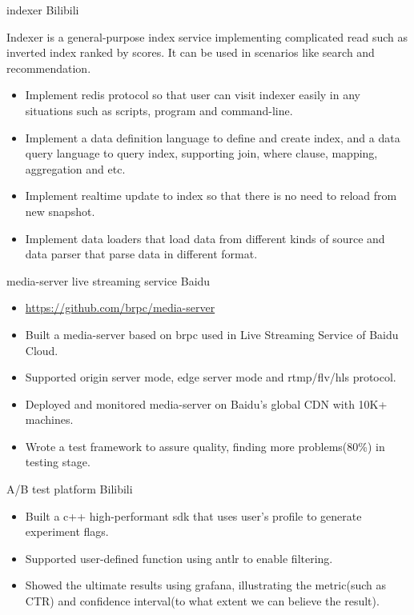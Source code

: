 \documentclass[11pt,a4paper]{moderncv}
\begin{document}
{indexer}
{Bilibili}
{}
{}
{
Indexer is a general-purpose index service implementing complicated read such as inverted index ranked by scores. It can be used in scenarios like search and recommendation.
\begin{itemize}
    \item Implement redis protocol so that user can visit indexer easily in any situations such as scripts, program and command-line.
    \item Implement a data definition language to define and create index, and a data query language to query index, supporting join, where clause, mapping, aggregation and etc.
    \item Implement realtime update to index so that there is no need to reload from new snapshot.
    \item Implement data loaders that load data from different kinds of source and data parser that parse data in different format.
\end{itemize}
}


{media-server}
{live streaming service}
{Baidu}
{}
{
\begin{itemize}
    \item \url{https://github.com/brpc/media-server}
    \item Built a media-server based on brpc used in Live Streaming Service of Baidu Cloud.
    \item Supported origin server mode, edge server mode and rtmp/flv/hls protocol.
    \item Deployed and monitored media-server on Baidu's global CDN with 10K+ machines.
    \item Wrote a test framework to assure quality, finding more problems(80\%) in testing stage.
\end{itemize}
}

{A/B test platform}
{Bilibili}
{}
{}
{
\begin{itemize}
    \item Built a c++ high-performant sdk that uses user's profile to generate experiment flags.
    \item Supported user-defined function using antlr to enable filtering.
    \item Showed the ultimate results using grafana, illustrating the metric(such as CTR) and confidence interval(to what extent we can believe the result).
\end{itemize}
}
\end{document}
